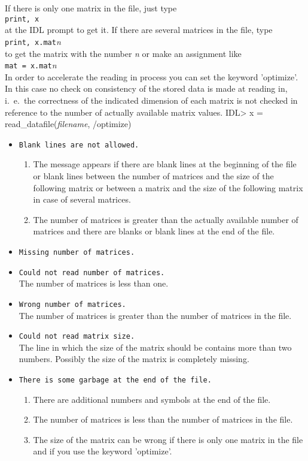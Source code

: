If there is only one matrix in the file, just type \\
\texttt{print, x} \\
at the IDL prompt to get it. If there are several matrices in the
file, type \\
\texttt{print, x.mat}\textit{n} \\
to get the matrix with the number \textit{n} or make an assignment
like \\
\texttt{mat = x.mat}\textit{n} \\
In order to accelerate the reading in process you can set the keyword
'optimize'. In this case no check on consistency of the stored data is
made at reading in, i.\ e.\ the correctness of the indicated dimension
of each matrix is not checked in reference to the number of actually
available matrix values.
{\ttfamily IDL> x = read\_datafile(\textnormal{\textit{filename}},%
 /optimize)}
\begin{itemize}
  \item \texttt{Blank lines are not allowed.}
        \begin{enumerate}
          \item The message appears if there are blank lines at the
                beginning of the file or blank lines between the
                number of matrices and the size of the following
                matrix or between a matrix and the size of the
                following matrix in case of several matrices.
          \item The number of matrices is greater than the actually
                available number of matrices and there are blanks or
                blank lines at the end of the file.
        \end{enumerate}
  \item \texttt{Missing number of matrices.}
  \item \texttt{Could not read number of matrices.} \\
        The number of matrices is less than one.
  \item \texttt{Wrong number of matrices.} \\
        The number of matrices is greater than the number of matrices
        in the file.
  \item \texttt{Could not read matrix size.} \\
        The line in which the size of the matrix should be contains
        more than two numbers. Possibly the size of the matrix is
        completely missing.
  \item \texttt{There is some garbage at the end of the file.}
        \begin{enumerate}
          \item There are additional numbers and symbols at the end of
                the file.
          \item The number of matrices is less than the number of
                matrices in the file.
          \item The size of the matrix can be wrong if there is only
                one matrix in the file and if you use the keyword
                'optimize'.
        \end{enumerate}
\end{itemize}
